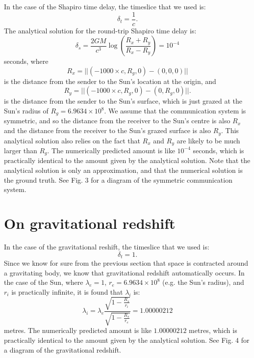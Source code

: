 \documentclass[12pt]{article}
\begin{document}
In the case of the Shapiro time delay, the timeslice that we used is:
\begin{equation}
\label{dt_1_div_c}
\delta_{t} = \frac{1}{c}.
\end{equation}
The analytical solution for the round-trip Shapiro time delay is:
\begin{equation}
\label{delta_s}
\delta_{s} = \frac{2GM}{c^3} \log\left( \frac{R_x + R_y}{R_x - R_y} \right) = 10^{-4}
\end{equation}
seconds, where 
\begin{equation}
\label{r_x}
R_x = \lvert\lvert (-1000 \times c, R_g, 0) - (0, 0, 0) \rvert\rvert
\end{equation}
is the distance from the sender to the Sun's location at the origin, and
\begin{equation}
\label{r_y}
R_y = \lvert\lvert (-1000 \times c, R_g, 0) - (0, R_g, 0) \rvert\rvert.
\end{equation}
is the distance from the sender to the Sun's surface, which is just grazed at the Sun's radius of $R_g = 6.9634 \times 10^8$.
We assume that the communication system is symmetric, and so the distance from the receiver to the Sun's centre is also $R_x$ and the distance from the receiver to the Sun's grazed surface is also $R_y$.
This analytical solution also relies on the fact that $R_x$ and $R_y$ are likely to be much larger than $R_g$.
The numerically predicted amount is like $10^{-4}$ seconds, which is practically identical to the amount given by the analytical solution.
Note that the analytical solution is only an approximation, and that the numerical solution is the ground truth.
See Fig. 3 for a diagram of the symmetric communication system.







\section{On gravitational redshift}


In the case of the gravitational reshift, the timeslice that we used is:
\begin{equation}
\label{dt_1_too}
\delta_{t} = 1.
\end{equation}
Since we know for sure from the previous section that space is contracted around a gravitating body, we know that gravitational redshift automatically occurs.
In the case of the Sun, where $\lambda_{e} = 1$, $r_e = 6.9634 \times 10^8$ (e.g. the Sun's radius), and $r_i$ is practically infinite, it is found that $\lambda_{i}$ is:
\begin{equation}
\label{wl_inf}
\lambda_{i} = \lambda_{e} \frac{        \sqrt{1 - \frac{R_s}{r_i}     }  }{  \sqrt{       1 - \frac{R_s}{r_e}     } } = 1.00000212
\end{equation}
metres.
The numerically predicted amount is like $1.00000212$ metres, which is practically identical to the amount given by the analytical solution.
See Fig. 4 for a diagram of the gravitational redshift.
\end{document}
